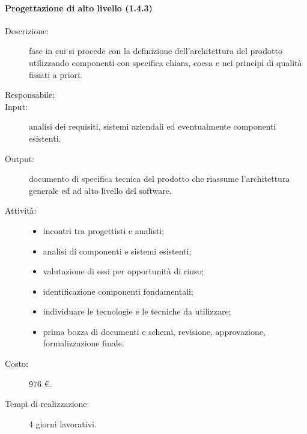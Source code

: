 \paragraph{Progettazione di alto livello (1.4.3)}
\begin{description}
\item[Descrizione:] fase in cui si procede con la definizione dell'architettura del prodotto utilizzando componenti con
specifica chiara, coesa e nei principi di qualit\`{a} fissati a priori.
\item[Responsabile:] 
\item[Input:] analisi dei requisiti, sistemi aziendali ed eventualmente componenti esistenti.
\item[Output:] documento di specifica tecnica del prodotto che riassume l'architettura generale ed ad
alto livello del software.
\item[Attivit\`{a}:] 
\begin{center}
\begin{itemize}
\item incontri tra progettisti e analisti;
\item analisi di componenti e sistemi esistenti;
\item valutazione di essi per opportunit\`{a} di riuso;
\item identificazione componenti fondamentali;
\item individuare le tecnologie e le tecniche da utilizzare;
\item prima bozza di documenti e schemi, revisione, approvazione, formalizzazione finale.
\end{itemize}
\end{center}
\item[Costo:] 976 \euro{}.
\item[Tempi di realizzazione:] 4 giorni lavorativi.
\end{description}

